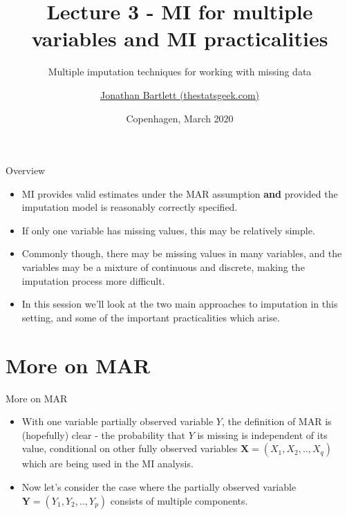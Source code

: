 \documentclass[ignorenonframetext,]{beamer}
\title{Lecture 3 - MI for multiple variables and MI practicalities}
\subtitle{Multiple imputation techniques for working with missing data}
\author{\href{https://thestatsgeek.com}{Jonathan Bartlett (thestatsgeek.com)}}
\date{Copenhagen, March 2020}
\providecommand{\tightlist}{%
  \setlength{\itemsep}{0pt}\setlength{\parskip}{0pt}}
\begin{document}
\frame{\titlepage}

\begin{frame}
\tableofcontents[hideallsubsections]
\end{frame}
\begin{frame}{Overview}
\protect\hypertarget{overview}{}

\begin{itemize}
\tightlist
\item
  MI provides valid estimates under the MAR assumption \textbf{and}
  provided the imputation model is reasonably correctly specified.
\item
  If only one variable has missing values, this may be relatively
  simple.
\item
  Commonly though, there may be missing values in many variables, and
  the variables may be a mixture of continuous and discrete, making the
  imputation process more difficult.
\item
  In this session we'll look at the two main approaches to imputation in
  this setting, and some of the important practicalities which arise.
\end{itemize}

\end{frame}

\hypertarget{more-on-mar}{%
\section{More on MAR}\label{more-on-mar}}

\begin{frame}{More on MAR}
\protect\hypertarget{more-on-mar-1}{}

\begin{itemize}
\tightlist
\item
  With one variable partially observed variable \(Y\), the definition of
  MAR is (hopefully) clear - the probability that \(Y\) is missing is
  independent of its value, conditional on other fully observed
  variables \(\mathbf X=(X_{1},X_{2},..,X_{q})\) which are being used in
  the MI analysis.
\item
  Now let's consider the case where the partially observed variable
  \(\mathbf Y=(Y_{1},Y_{2},..,Y_{p})\) consists of multiple components.
\end{itemize}

\end{frame}
\end{document}
